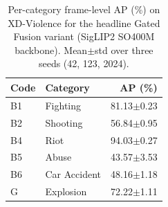 \begin{table}[t]
\centering
\caption{Per-category frame-level AP (\%) on XD-Violence for the headline Gated Fusion variant (SigLIP2 SO400M backbone). Mean$\pm$std over three seeds (42, 123, 2024).}
\label{tab:percat-xd}
\begin{tabular}{llr}
\toprule
Code & Category & AP (\%) \\
\midrule
B1 & Fighting & 81.13$\pm$0.23 \\
B2 & Shooting & 56.84$\pm$0.95 \\
B4 & Riot & 94.03$\pm$0.27 \\
B5 & Abuse & 43.57$\pm$3.53 \\
B6 & Car Accident & 48.16$\pm$1.18 \\
G & Explosion & 72.22$\pm$1.11 \\
\bottomrule
\end{tabular}
\end{table}
